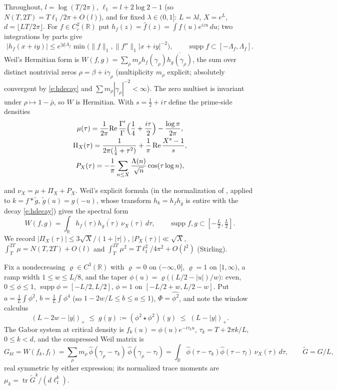 \documentclass[11pt]{article}
\numberwithin{equation}{section}
\theoremstyle{definition}
\theoremstyle{remark}
\newcommand{\LL}{\Lambda}
\begin{document}
Throughout, $l=\log(T/2\pi)$, $\ell_1=l+2\log2-1$ (so
$N(T,2T)=T\ell_1/2\pi+O(l)$), and for fixed
$\lambda\in(0,1]$: $L=\lambda l$, $X=e^{L}$,
$d=\lfloor LT/2\pi\rfloor$. For $f\in C_c^{2}(\mathbb R)$
put $h_f(z)=\widehat f(z)=\int f(u)e^{izu}\,du$; two
integrations by parts give
\begin{equation}\label{e:hdecay}
|h_f(x+iy)|\le e^{|y|\Lambda_f}
\min\bigl(\|f\|_1,\|f''\|_1|x+iy|^{-2}\bigr),
\qquad\operatorname{supp}f\subset[-\Lambda_f,\Lambda_f].
\end{equation}
Weil's Hermitian form is
$W(f,g)=\sum_{\rho}m_\rho h_f(\gamma_\rho)
\overline{h_g(\gamma_\rho)}$, the sum over distinct
nontrivial zeros $\rho=\beta+i\gamma_\rho$ (multiplicity
$m_\rho$ explicit; absolutely convergent by \eqref{e:hdecay}
and $\sum m_\rho|\gamma_\rho|^{-2}<\infty$). The zero
multiset is invariant under $\rho\mapsto1-\bar\rho$, so $W$
is Hermitian. With $s=\tfrac12+i\tau$ define the prime-side
densities
\begin{gather*}
\mu(\tau)=\frac1{2\pi}\mathrm{Re}\,
\frac{\Gamma'}{\Gamma}\Bigl(\frac14+\frac{i\tau}2\Bigr)
-\frac{\log\pi}{2\pi}, \\
\Pi_X(\tau)=\frac{1}{2\pi(\tfrac14+\tau^{2})}
+\frac1\pi\,\mathrm{Re}\,\frac{X^{s}-1}{s}, \\
P_X(\tau)=-\frac1\pi\sum_{n\le X}
\frac{\LL(n)}{\sqrt n}\cos(\tau\log n),
\end{gather*}

and $\nu_X=\mu+\Pi_X+P_X$. Weil's explicit formula
\cite{Wei52} (in the normalization of
\cite[Thm.~5.12]{IK}, applied to $k=f*\tilde g$,
$\tilde g(u)=g(-u)$, whose transform $h_k=h_fh_{\bar g}$ is
entire with the decay \eqref{e:hdecay}) gives the spectral
form
\begin{equation}\label{e:weil}
W(f,g)=\int_{\mathbb R}h_f(\tau)\overline{h_g(\tau)}\,
\nu_X(\tau)\,d\tau,
\qquad\operatorname{supp}f,g\subset[-\tfrac L2,\tfrac L2].
\end{equation}
We record $|\Pi_X(\tau)|\le3\sqrt X/(1+|\tau|)$,
$|P_X(\tau)|\ll\sqrt X$, $\int_T^{2T}\mu=N(T,2T)+O(l)$ and
$\int_T^{2T}\mu^{2}=T\ell_1^{2}/4\pi^{2}+O(l^{2})$
(Stirling).

Fix a nondecreasing $\varrho\in C^{3}(\mathbb R)$ with
$\varrho=0$ on $(-\infty,0]$, $\varrho=1$ on $[1,\infty)$,
a ramp width $1\le w\le L/8$, and the taper
$\phi(u)=\varrho\bigl((L/2-|u|)/w\bigr)$: even,
$0\le\phi\le1$, $\operatorname{supp}\phi=[-L/2,L/2]$,
$\phi=1$ on $[-L/2+w,L/2-w]$. Put $a=\tfrac1L\int\phi^{2}$,
$b=\tfrac1L\int\phi^{4}$ (so $1-2w/L\le b\le a\le1$),
$\Phi=\widehat{\phi^{2}}$, and note the window calculus
\begin{equation}\label{e:windowcalc}
(L-2w-|y|)_+\;\le\;g(y):=(\phi^{2}\star\phi^{2})(y)
\;\le\;(L-|y|)_+ .
\end{equation}
The Gabor system at critical density is
$f_k(u)=\phi(u)e^{-i\tau_ku}$, $\tau_k=T+2\pi k/L$,
$0\le k<d$, and the compressed Weil matrix is
\[
G_{kl}=W(f_k,f_l)
=\sum_\rho m_\rho\,\widehat\phi(\gamma_\rho-\tau_k)\,
\widehat\phi(\gamma_\rho-\tau_l)
=\int_{\mathbb R}\widehat\phi(\tau-\tau_k)
\widehat\phi(\tau-\tau_l)\,\nu_X(\tau)\,d\tau,
\qquad\widetilde G=G/L,
\]
real symmetric by either expression; its normalized trace
moments are
$\mu_k=\operatorname{tr}\widetilde G^{k}/(d\ell_1^{k})$.
\end{document}
